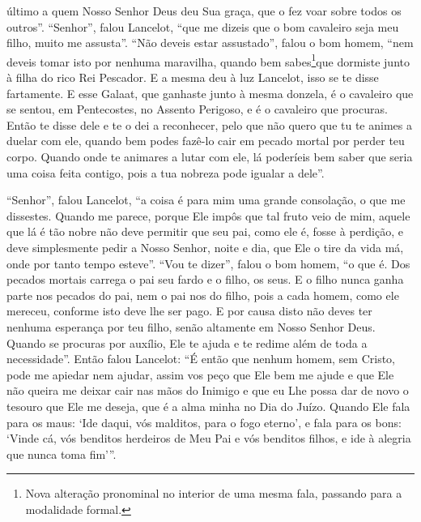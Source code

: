 último a quem Nosso Senhor Deus deu Sua graça, que o fez voar sobre todos os
outros”. “Senhor”, falou Lancelot, “que me dizeis que o bom
cavaleiro seja meu filho, muito me assusta”. “Não deveis estar assustado”,
falou o bom homem, “nem deveis tomar isto por nenhuma maravilha, quando bem
sabes\footnote{ Nova alteração pronominal no interior de uma mesma fala,
passando para a modalidade formal. }que dormiste junto à filha do
rico Rei Pescador. E a mesma deu à luz Lancelot, isso se te disse fartamente.
E esse Galaat, que ganhaste junto à mesma donzela, é o cavaleiro que se sentou,
em Pentecostes, no Assento Perigoso, e é o cavaleiro que procuras. Então te
disse dele e te o dei a reconhecer, pelo que não quero que tu te animes a
duelar com ele, quando bem podes fazê-lo cair em pecado mortal por perder teu
corpo. Quando onde te animares a lutar com ele, lá poderíeis bem saber que
seria uma coisa feita contigo, pois a tua nobreza pode igualar a dele”.

 “Senhor”, falou Lancelot, “a coisa é para mim uma grande consolação, o que me
dissestes. Quando me parece, porque Ele impôs que tal fruto veio de mim, aquele
que lá é tão nobre não deve permitir que seu pai, como ele é, fosse à perdição,
e deve simplesmente pedir a Nosso Senhor, noite e dia, que Ele o tire da vida
má, onde por tanto tempo esteve”. “Vou te dizer”, falou o bom homem, “o que é.
Dos pecados mortais carrega o pai seu fardo e o filho, os seus. E o filho nunca
ganha parte nos pecados do pai, nem o pai nos do filho, pois a cada homem, como
ele mereceu, conforme isto deve lhe ser pago. E por causa disto não deves ter
nenhuma esperança por teu filho, senão altamente em Nosso Senhor Deus. Quando
se procuras por auxílio, Ele te ajuda e te redime além de toda a necessidade”.
Então falou Lancelot: “É então que nenhum homem, sem Cristo, pode me apiedar
nem ajudar, assim vos peço que Ele bem me ajude e que Ele não queira me deixar
cair nas mãos do Inimigo e que eu Lhe possa dar de novo o tesouro que Ele me
deseja, que é a alma minha no Dia do Juízo. Quando Ele fala para os maus: ‘Ide
daqui, vós malditos, para o fogo eterno’, e fala para os bons: ‘Vinde cá, vós
benditos herdeiros de Meu Pai e vós benditos filhos, e ide à alegria que nunca
toma fim’”. 

